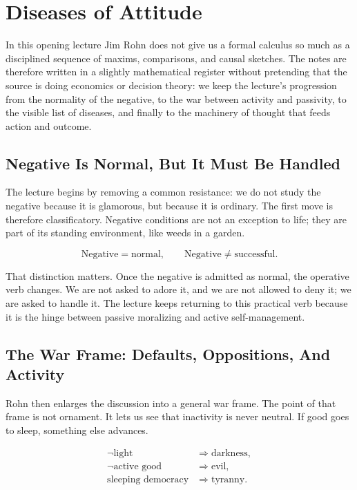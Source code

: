 \chapter{Diseases of Attitude}

In this opening lecture Jim Rohn does not give us a formal calculus so much as a disciplined sequence of maxims, comparisons, and causal sketches. The notes are therefore written in a slightly mathematical register without pretending that the source is doing economics or decision theory: we keep the lecture's progression from the normality of the negative, to the war between activity and passivity, to the visible list of diseases, and finally to the machinery of thought that feeds action and outcome.

\section{Negative Is Normal, But It Must Be Handled}

The lecture begins by removing a common resistance: we do not study the negative because it is glamorous, but because it is ordinary. The first move is therefore classificatory. Negative conditions are not an exception to life; they are part of its standing environment, like weeds in a garden.

\begin{equation}
\text{Negative} = \text{normal}, \qquad \text{Negative} \neq \text{successful}.
\end{equation}

That distinction matters. Once the negative is admitted as normal, the operative verb changes. We are not asked to adore it, and we are not allowed to deny it; we are asked to handle it. The lecture keeps returning to this practical verb because it is the hinge between passive moralizing and active self-management.

\section{The War Frame: Defaults, Oppositions, And Activity}

Rohn then enlarges the discussion into a general war frame. The point of that frame is not ornament. It lets us see that inactivity is never neutral. If good goes to sleep, something else advances.

\begin{align}
\neg \text{light} &\Rightarrow \text{darkness},\\
\neg \text{active good} &\Rightarrow \text{evil},\\
\text{sleeping democracy} &\Rightarrow \text{tyranny}.
\end{align}

